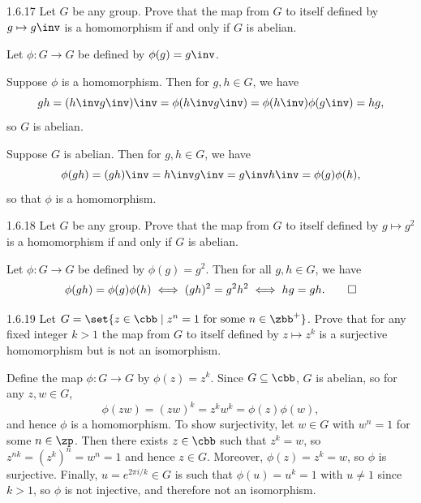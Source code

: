 \begin{exercise}{1.6.17}
    Let $G$ be any group.
	Prove that the map from $G$ to itself defined by $g \mapsto g\inv$ is a homomorphism if and only if $G$ is abelian.
\end{exercise}

\begin{sol}
    Let $\phi \colon G \to G$ be defined by $\phi(g) = g\inv$.

    \rightimp Suppose $\phi$ is a homomorphism.
	Then for $g, h \in G$, we have
    \[
        gh = (h\inv g\inv)\inv = \phi(h\inv g\inv) = \phi(h\inv)\phi(g\inv) = hg,
    \]
    so $G$ is abelian.
    
    \leftimp Suppose $G$ is abelian.
	Then for $g, h \in G$, we have
    \[
    	\phi(gh) = (gh)\inv = h\inv g\inv = g\inv h\inv = \phi(g)\phi(h),
    \]
    so that $\phi$ is a homomorphism.
\end{sol}

\begin{exercise}{1.6.18}
    Let $G$ be any group.
	Prove that the map from $G$ to itself defined by $g \mapsto g^2$ is a homomorphism if and only if $G$ is abelian.
\end{exercise}

\begin{sol}
    Let $\phi \colon G \to G$ be defined by $\phi(g) = g^2$.
    Then for all $g, h \in G$, we have
    \[
        \phi(gh) = \phi(g)\phi(h) \iff (gh)^2 = g^2 h^2 \iff hg = gh. \qedhere
    \]
\end{sol}

\begin{exercise}{1.6.19}
    Let $G = \set{ z \in \cbb\mid z^n = 1 \text{ for some } n \in \zbb^+ }$.
	Prove that for any fixed integer $k > 1$ the map from $G$ to itself defined by $z \mapsto z^k$ is a surjective homomorphism but is not an isomorphism.
\end{exercise}

\begin{sol}
    Define the map $\phi \colon G \to G$ by $\phi(z) = z^k$.
    Since $G \subseteq \cbb$, $G$ is abelian, so for any $z, w \in G$,
    \[
    	\phi(zw) = (zw)^k = z^kw^k = \phi(z)\phi(w),
    \]
    and hence $\phi$ is a homomorphism.
	To show surjectivity, let $w \in G$ with $w^n = 1$ for some $n \in \zp$.
    Then there exists $z \in \cbb$ such that $z^k = w$, so $z^{nk} = (z^k)^n = w^n = 1$ and hence $z \in G$.
    Moreover, $\phi(z) = z^k = w$, so $\phi$ is surjective.
    Finally, $u = e^{2\pi i/k} \in G$ is such that $\phi(u) = u^k = 1$ with $u \neq 1$ since $k > 1$, so $\phi$ is not injective, and therefore not an isomorphism.
\end{sol}

